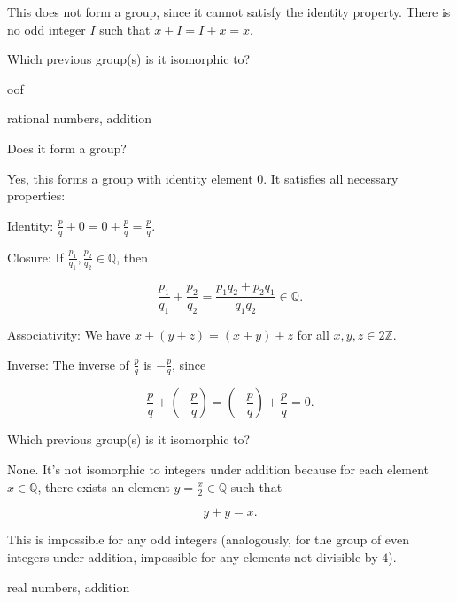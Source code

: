 \documentclass[../gatm_answers.tex]{subfiles}
\begin{document}
This does not form a group, since it cannot satisfy the identity property. There is no odd integer $I$ such that $x+I=I+x=x$.

\begin{iinner_problem}
\item Which previous group(s) is it isomorphic to?
\end{iinner_problem}

oof

\begin{inner_problem}
\item rational numbers, addition
\end{inner_problem}

\begin{iinner_problem}[start=1]
\item Does it form a group?
\end{iinner_problem}

Yes, this forms a group with identity element $0$. It satisfies all necessary properties:

Identity: $\frac{p}{q}+0=0+\frac{p}{q}=\frac{p}{q}$.

Closure: If $\frac{p_1}{q_1},\frac{p_2}{q_2}\in \mathbb{Q}$, then

$$\frac{p_1}{q_1}+\frac{p_2}{q_2}=\frac{p_1q_2+p_2q_1}{q_1q_2}\in \mathbb{Q}.$$

Associativity: We have $x+(y+z)=(x+y)+z$ for all $x,y,z \in 2\mathbb{Z}$.

Inverse: The inverse of $\frac{p}{q}$ is $-\frac{p}{q}$, since

$$\frac{p}{q}+\left(-\frac{p}{q}\right)=\left(-\frac{p}{q}\right)+\frac{p}{q}=0.$$

\begin{iinner_problem}
\item Which previous group(s) is it isomorphic to?
\end{iinner_problem}

None. It's not isomorphic to integers under addition because for each element $x\in \mathbb{Q}$, there exists an element $y=\frac{x}{2}\in \mathbb{Q}$ such that

$$y+y=x.$$

This is impossible for any odd integers (analogously, for the group of even integers under addition, impossible for any elements not divisible by $4$).

\begin{inner_problem}
\item real numbers, addition
\end{inner_problem}
\end{document}
